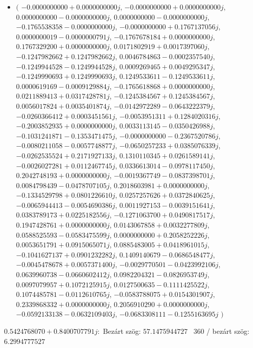 \documentclass[14pt,a4paper]{article}
\begin{document}
\begin{itemize}
\item
$\big($
$-0.0000000000+0.0000000000j$, $-0.0000000000+0.0000000000j$, $0.0000000000-0.0000000000j$, $0.0000000000-0.0000000000j$, $-0.1765538358-0.0000000000j$, $-0.0000000000+0.1767137056j$, $0.0000000019-0.0000000791j$, $-0.1767678184+0.0000000000j$, $0.1767329200+0.0000000000j$, $0.0171802919+0.0017397060j$, $-0.1247982662+0.1247982662j$, $0.0046784863-0.0002357540j$, $-0.1249944528-0.1249944528j$, $0.0009269465+0.0049295347j$, $-0.1249990693+0.1249990693j$, $0.1249533611-0.1249533611j$, $0.0000619169-0.0009129884j$, $-0.1765618868+0.0000000000j$, $0.0211889413+0.0317428781j$, $-0.1245384567+0.1245384567j$, $0.0056017824+0.0035401874j$, $-0.0142972289-0.0643222379j$, $-0.0260366412+0.0003451561j$, $-0.0053951311+0.1284020316j$, $-0.2003852935+0.0000000000j$, $0.0033113145-0.0350426988j$, $-0.1031241871-0.1353471475j$, $-0.0000000000-0.2367520786j$, $-0.0080211058-0.0057748877j$, $-0.0650257233+0.0385076339j$, $-0.0262535524+0.2171927133j$, $0.1310110345+0.0261589141j$, $-0.0026027281+0.0112467745j$, $0.0336613014-0.0978117450j$, $0.2042748193+0.0000000000j$, $-0.0019367749-0.0837398701j$, $0.0084798439-0.0478707105j$, $0.2018603981+0.0000000000j$, $-0.1334529798+0.0801226610j$, $0.0257257626+0.0372840625j$, $-0.0065944413-0.0054690386j$, $0.0011927153-0.0039151641j$, $0.0383789173+0.0225182556j$, $-0.1271063700+0.0490817517j$, $0.1947428761+0.0000000000j$, $0.0143067858+0.0032277809j$, $0.0588525593-0.0583475599j$, $0.0000000000+0.2058252226j$, $0.0053651791+0.0915065071j$, $0.0885483005+0.0418961015j$, $-0.1041627137+0.0901232282j$, $0.1409140679-0.0686548477j$, $-0.0045478678+0.0057371400j$, $-0.0029770501-0.0423992106j$, $0.0639960738-0.0660602412j$, $0.0982204321-0.0826953749j$, $0.0097079957+0.1072125915j$, $0.0127500635-0.1111425522j$, $0.1074485781-0.0112610765j$, $-0.0583788075+0.0154301907j$, $0.2339868332+0.0000000000j$, $0.2056910290+0.0000000000j$, $-0.0592133138-0.0632109403j$, $-0.0683308111-0.1255163695j$
$\big)$
\end{itemize}
$0.5424768070+0.8400707791j$:\
Bezárt szög: $57.1475944727$ \
360 / bezárt szög: $6.2994777527$\
\end{document}

